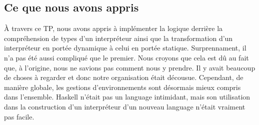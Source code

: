\documentclass[a4paper,12pt]{article}
\begin{document}
    \subsection{Ce que nous avons appris}
        À travers ce TP, nous avons appris à implémenter la logique derrière 
        la compréhension de types d'un interpréteur ainsi que la transformation
        d'un interpréteur en portée dynamique à celui en portée statique. 
        Surprennament, il n'a pas été aussi compliqué que le premier. Nous croyons
        que cela est dû au fait que, à l'origine, nous ne savions pas comment nous
        y prendre. Il y avait beaucoup de choses à regarder et donc notre 
        organisation était décousue. Cependant, de manière globale, les gestions 
        d'environnements sont désormais mieux compris dans l'ensemble. Haskell 
        n'était pas un language intimidant, mais son utilisation dans la construction
        d'un interpréteur d'un nouveau language n'était vraiment pas facile.
\end{document}
